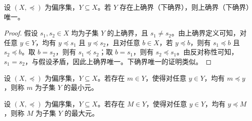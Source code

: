 \vspace{1em}

\begin{theorem}[确界唯一性]
    设 $ (X,\preceq) $ 为偏序集，$ Y\subseteq X $。若 $ Y $ 存在上确界（下确界），则上确界（下确界）唯一。
\end{theorem}

\begin{proof}
    假设 $ s_1,s_2\in X $ 均为子集 $ Y $ 的上确界，且 $ s_1\neq s_2 $。由上确界定义可知，对任意 $ y\in Y $，均有 $ y\preceq s_1 $ 且 $ y\preceq s_2 $，且对任意 $ b\in X $，若 $ y\preceq b $，则有 $ s_1\preceq b $ 且 $ s_2\preceq b $。取 $ b=s_2 $，则有 $ s_1\preceq s_2 $；取 $ b=s_1 $，则有 $ s_2\preceq s_1 $。由反对称性可知，$ s_1=s_2 $，与假设矛盾，因此上确界唯一。下确界唯一的证明类似。
\end{proof}

\vspace{1em}

\begin{definition}
    设 $ (X,\preceq) $ 为偏序集，$ Y\subseteq X $。若存在 $ m\in Y $，使得对任意 $ y\in Y $，均有 $ m\preceq y $，则称 $ m $ 为子集 $ Y $ 的最小元。
\end{definition}

\begin{definition}
    设 $ (X,\preceq) $ 为偏序集，$ Y\subseteq X $。若存在 $ M\in Y $，使得对任意 $ y\in Y $，均有 $ y\preceq M $，则称 $ M $ 为子集 $ Y $ 的最大元。
\end{definition}



\vspace{1em}

\newpage